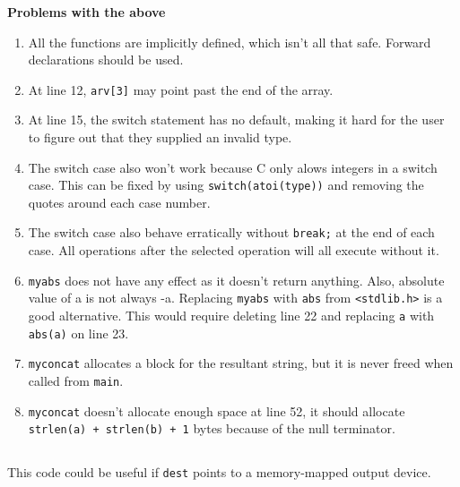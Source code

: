 \documentclass[a4paper,11pt]{article}
\def\code#1{\texttt{#1}}
\begin{document}
\textbf{Problems with the above}
\begin{enumerate}
  \item
    All the functions are implicitly defined, which isn't all that safe.
    Forward declarations should be used.
  \item
    At line 12, \code{arv[3]} may point past the end of the array.
  \item
    At line 15, the switch statement has no default, making it hard for the user to figure
    out that they supplied an invalid type.
  \item
    The switch case also won't work because C only alows integers in a switch case.
    This can be fixed by using \code{switch(atoi(type))} and removing the quotes around
    each case number.
  \item
    The switch case also behave erratically without \code{break;} at the end of each case.
    All operations after the selected operation will all execute without it.
  \item
    \code{myabs} does not have any effect as it doesn't return anything.
    Also, absolute value of a is not always -a.
    Replacing \code{myabs} with \code{abs} from \code{<stdlib.h>} is a good alternative.
    This would require deleting line 22 and replacing \code{a} with \code{abs(a)} on line 23.
  \item
    \code{myconcat} allocates a block for the resultant string, but it is never freed
    when called from \code{main}.
  \item
    \code{myconcat} doesn't allocate enough space at line 52, it should allocate
    \code{strlen(a) + strlen(b) + 1} bytes because of the null terminator.
\end{enumerate}

\subsection{}
This code could be useful if \code{dest} points to a memory-mapped output device.
\end{document}
